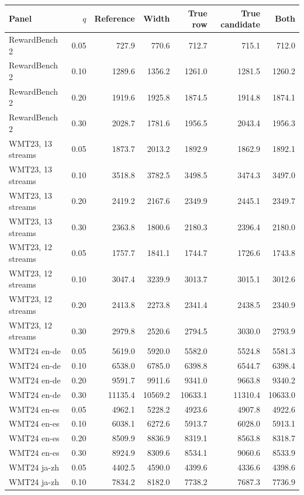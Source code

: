\begin{table}[t]
\centering\small
\begin{tabular}{lrrrrrr}
\toprule
Panel & $q$ & Reference & Width & True row & True candidate & Both \\
\midrule
RewardBench 2 & 0.05 & 727.9 & 770.6 & 712.7 & 715.1 & 712.0 \\
RewardBench 2 & 0.10 & 1289.6 & 1356.2 & 1261.0 & 1281.5 & 1260.2 \\
RewardBench 2 & 0.20 & 1919.6 & 1925.8 & 1874.5 & 1914.8 & 1874.1 \\
RewardBench 2 & 0.30 & 2028.7 & 1781.6 & 1956.5 & 2043.4 & 1956.3 \\
WMT23, 13 streams & 0.05 & 1873.7 & 2013.2 & 1892.9 & 1862.9 & 1892.1 \\
WMT23, 13 streams & 0.10 & 3518.8 & 3782.5 & 3498.5 & 3474.3 & 3497.0 \\
WMT23, 13 streams & 0.20 & 2419.2 & 2167.6 & 2349.9 & 2445.1 & 2349.7 \\
WMT23, 13 streams & 0.30 & 2363.8 & 1800.6 & 2180.3 & 2396.4 & 2180.0 \\
WMT23, 12 streams & 0.05 & 1757.7 & 1841.1 & 1744.7 & 1726.6 & 1743.8 \\
WMT23, 12 streams & 0.10 & 3047.4 & 3239.9 & 3013.7 & 3015.1 & 3012.6 \\
WMT23, 12 streams & 0.20 & 2413.8 & 2273.8 & 2341.4 & 2438.5 & 2340.9 \\
WMT23, 12 streams & 0.30 & 2979.8 & 2520.6 & 2794.5 & 3030.0 & 2793.9 \\
WMT24 en-de & 0.05 & 5619.0 & 5920.0 & 5582.0 & 5524.8 & 5581.3 \\
WMT24 en-de & 0.10 & 6538.0 & 6785.0 & 6398.8 & 6544.7 & 6398.4 \\
WMT24 en-de & 0.20 & 9591.7 & 9911.6 & 9341.0 & 9663.8 & 9340.2 \\
WMT24 en-de & 0.30 & 11135.4 & 10569.2 & 10633.1 & 11310.4 & 10633.0 \\
WMT24 en-es & 0.05 & 4962.1 & 5228.2 & 4923.6 & 4907.8 & 4922.6 \\
WMT24 en-es & 0.10 & 6038.1 & 6272.6 & 5913.7 & 6028.0 & 5913.1 \\
WMT24 en-es & 0.20 & 8509.9 & 8836.9 & 8319.1 & 8563.8 & 8318.7 \\
WMT24 en-es & 0.30 & 8924.9 & 8309.6 & 8534.1 & 9060.6 & 8533.9 \\
WMT24 ja-zh & 0.05 & 4402.5 & 4590.0 & 4399.6 & 4336.6 & 4398.6 \\
WMT24 ja-zh & 0.10 & 7834.2 & 8182.0 & 7738.2 & 7687.3 & 7736.9 \\

\end{tabular}
\end{table}
